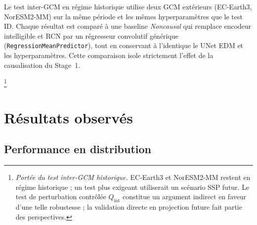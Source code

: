 \documentclass[14pt,a4paper,openany]{extreport}
\theoremstyle{definition}
\begin{document}
Le test inter-GCM en régime historique utilise deux GCM extérieurs (EC-Earth3, NorESM2-MM) sur la même période et les mêmes hyperparamètres que le test ID. Chaque résultat est comparé à une baseline \emph{Noncausal} qui remplace encodeur intelligible et RCN par un régresseur convolutif générique (\texttt{RegressionMeanPredictor}), tout en conservant à l'identique le UNet EDM et les hyperparamètres. Cette comparaison isole strictement l'effet de la causalisation du Stage~1.

\footnote{\emph{Portée du test inter-GCM historique.} EC-Earth3 et NorESM2-MM restent en régime historique ; un test plus exigeant utiliserait un scénario SSP futur. Le test de perturbation contrôlée $Q_{\mathrm{int}}$ constitue un argument indirect en faveur d'une telle robustesse ; la validation directe en projection future fait partie des perspectives.}

\section{Résultats observés}
\label{sec:exp-resultats}

\subsection{Performance en distribution}
\label{ssec:exp-res-id}
\end{document}
